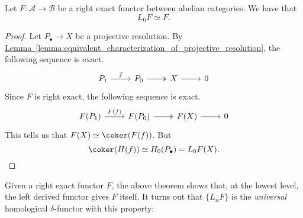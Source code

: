 \documentclass[main.tex]{subfiles}
\begin{document}
\begin{proposition}
  Let $F\colon \mathcal{A} \to \mathcal{B}$ be a right exact functor between abelian categories. We have that
  \begin{equation*}
    L_{0}F \simeq F.
  \end{equation*}
\end{proposition}
\begin{proof}
  Let $P_{\bullet} \to X$ be a projective resolution. By \hyperref[lemma:equivalent_characterization_of_projective_resolution]{Lemma~\ref*{lemma:equivalent_characterization_of_projective_resolution}}, the following sequence is exact.
  \begin{equation*}
    \begin{tikzcd}
      P_{1}
      \arrow[r, "f"]
      & P_{0}
      \arrow[r, twoheadrightarrow]
      & X
      \arrow[r]
      & 0
    \end{tikzcd}
  \end{equation*}
  Since $F$ is right exact, the following sequence is exact.
  \begin{equation*}
    \begin{tikzcd}
      F(P_{1})
      \arrow[r, "F(f)"]
      & F(P_{0})
      \arrow[r, twoheadrightarrow]
      & F(X)
      \arrow[r]
      & 0
    \end{tikzcd}
  \end{equation*}
  This tells us that $F(X) \simeq \coker(F(f))$. But
  \begin{equation*}
    \coker(H(f)) \simeq H_{0}(P_{\bullet}) = L_{0}F(X).
  \end{equation*}
\end{proof}

Given a right exact functor $F$, the above theorem shows that, at the lowest level, the left derived functor gives $F$ itself. It turns out that $\{L_{n}F\}$ is the \emph{universal} homological $\delta$-functor with this property:
\end{document}

